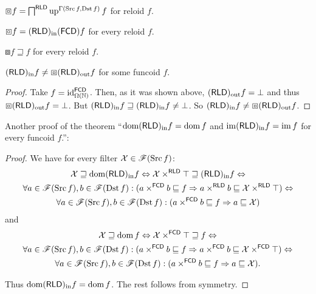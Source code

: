 \begin{defn}
$\boxbox f=\bigsqcap^{\mathsf{RLD}}\operatorname{up}^{\Gamma(\operatorname{Src} f,\operatorname{Dst} f)}f$
for reloid $f$.\end{defn}
\begin{conjecture}
$\boxbox f=(\mathsf{RLD})_{\mathrm{in}} (\mathsf{FCD}) f$ for every reloid $f$.
\end{conjecture}
\begin{obvious}
$\boxbox f\sqsupseteq f$ for every reloid $f$.\end{obvious}
\begin{example}
$(\mathsf{RLD})_{\mathrm{in}} f\neq\boxbox(\mathsf{RLD})_{\mathrm{out}} f$ for some funcoid
$f$.\end{example}
\begin{proof}
Take $f=\operatorname{id}_{\Omega(\mathbb{N})}^{\mathsf{FCD}}$. Then, as it was
shown above, $(\mathsf{RLD})_{\mathrm{out}} f=\bot$ and thus $\boxbox(\mathsf{RLD})_{\mathrm{out}} f=\bot$.
But $(\mathsf{RLD})_{\mathrm{in}} f\sqsupseteq(\mathsf{RLD})_{\mathrm{in}} f\neq\bot$. So $(\mathsf{RLD})_{\mathrm{in}} f\neq\boxbox(\mathsf{RLD})_{\mathrm{out}} f$.\end{proof}
Another proof of the theorem ``$\operatorname{dom}(\mathsf{RLD})_{\mathrm{in}} f=\operatorname{dom} f$ and $\operatorname{im}(\mathsf{RLD})_{\mathrm{in}} f=\operatorname{im} f$
for every funcoid $f$.'':
\begin{proof}
We have for every filter $\mathcal{X}\in\mathscr{F}(\operatorname{Src} f)$:
\begin{multline*}
\mathcal{X}\sqsupseteq\operatorname{dom}(\mathsf{RLD})_{\mathrm{in}} f\Leftrightarrow\mathcal{X}\times^{\mathsf{RLD}}\top\sqsupseteq(\mathsf{RLD})_{\mathrm{in}} f\Leftrightarrow\\
\forall a\in\mathscr{F}(\operatorname{Src} f),b\in\mathscr{F}(\operatorname{Dst} f):(a\times^{\mathsf{FCD}}b\sqsubseteq f\Rightarrow a\times^{\mathsf{RLD}}b\sqsubseteq\mathcal{X}\times^{\mathsf{RLD}}\top)\Leftrightarrow\\
\forall a\in\mathscr{F}(\operatorname{Src} f),b\in\mathscr{F}(\operatorname{Dst} f):(a\times^{\mathsf{FCD}}b\sqsubseteq f\Rightarrow a\sqsubseteq\mathcal{X})
\end{multline*}
and 
\begin{multline*}
\mathcal{X}\sqsupseteq\operatorname{dom} f\Leftrightarrow\mathcal{X}\times^{\mathsf{FCD}}\top\sqsupseteq f\Leftrightarrow\\
\forall a\in\mathscr{F}(\operatorname{Src} f),b\in\mathscr{F}(\operatorname{Dst} f):(a\times^{\mathsf{FCD}}b\sqsubseteq f\Rightarrow a\times^{\mathsf{FCD}}b\sqsubseteq\mathcal{X}\times^{\mathsf{FCD}}\top)\Leftrightarrow\\
\forall a\in\mathscr{F}(\operatorname{Src} f),b\in\mathscr{F}(\operatorname{Dst} f):(a\times^{\mathsf{FCD}}b\sqsubseteq f\Rightarrow a\sqsubseteq\mathcal{X}).
\end{multline*}


Thus $\operatorname{dom}(\mathsf{RLD})_{\mathrm{in}} f=\operatorname{dom} f$. The rest follows from symmetry.\end{proof}


